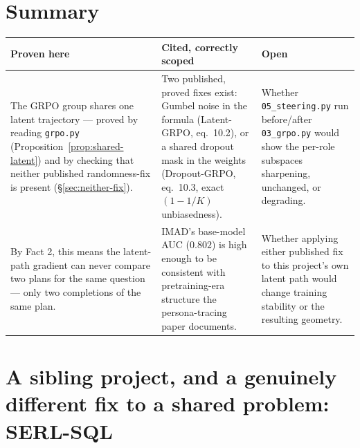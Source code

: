 \documentclass[11pt]{article}
\theoremstyle{definition}
\begin{document}
\begin{center}
\end{center}

\section{Summary}

\begin{center}
\begin{tabular}{p{}p{}p{}}
\toprule
\textbf{Proven here} & \textbf{Cited, correctly scoped} & \textbf{Open} \\
\midrule
The GRPO group shares one latent trajectory --- proved by reading
\texttt{grpo.py} (Proposition~\ref{prop:shared-latent}) and by checking that
neither published randomness-fix is present (\S\ref{sec:neither-fix}).
&
Two published, proved fixes exist: Gumbel noise in the formula
(Latent-GRPO, eq.~10.2), or a shared dropout mask in the weights
(Dropout-GRPO, eq.~10.3, exact $(1-1/K)$ unbiasedness).
&
Whether \texttt{05\_steering.py} run before/after \texttt{03\_grpo.py} would
show the per-role subspaces sharpening, unchanged, or degrading.
\\[8pt]
By Fact 2, this means the latent-path gradient can never compare two plans
for the same question --- only two completions of the same plan.
&
IMAD's base-model AUC ($0.802$) is high enough to be consistent with
pretraining-era structure the persona-tracing paper documents.
&
Whether applying either published fix to this project's own latent path
would change training stability or the resulting geometry.
\\
\bottomrule
\end{tabular}
\end{center}

\section{A sibling project, and a genuinely different fix to a shared problem: SERL-SQL}
\label{sec:serl-sql}
\end{document}
